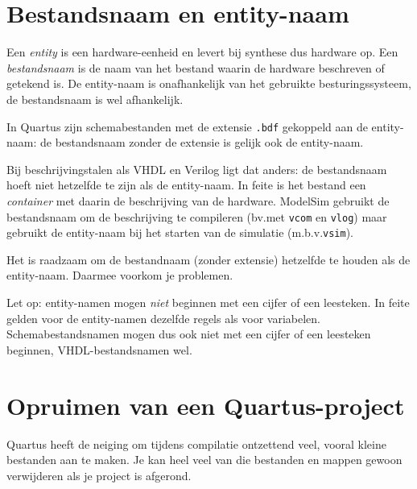\documentclass[a4paper,12pt,fleqn,twoside]{book}
\newcommand{\naam}[1]{\texttt{#1}}
\begin{document}


\section{Bestandsnaam en entity-naam}
\label{sec:bestandsnaamenentitynaam}
Een \textsl{entity} is een hardware-eenheid en levert bij synthese
dus hardware op. Een \textsl{bestandsnaam} is de naam van het bestand
waarin de hardware beschreven of getekend is. De entity-naam is
onafhankelijk van het gebruikte besturingssysteem, de bestandsnaam is
wel afhankelijk.

In Quartus zijn schemabestanden met de extensie \naam{.bdf}
gekoppeld aan de entity-naam: de bestandsnaam zonder de extensie
is gelijk ook de entity-naam.

Bij beschrijvingstalen als VHDL en Verilog ligt dat anders: de
bestandsnaam hoeft niet hetzelfde te zijn als de entity-naam. In feite
is het bestand een \textsl{container} met daarin de beschrijving
van de hardware. ModelSim gebruikt de bestandsnaam om de beschrijving
te compileren (bv.\@ met \naam{vcom} en \naam{vlog}) maar gebruikt de
entity-naam bij het starten van de simulatie (m.b.v.\@ \naam{vsim}).

Het is raadzaam om de bestandnaam (zonder extensie) hetzelfde te houden
als de entity-naam. Daarmee voorkom je problemen.

Let op: entity-namen mogen \textsl{niet} beginnen met een cijfer of
een leesteken. In feite gelden voor de entity-namen dezelfde regels als
voor variabelen. Schemabestandsnamen mogen dus ook niet met een cijfer
of een leesteken beginnen, VHDL-bestandsnamen wel.


\section{Opruimen van een Quartus-project}
\label{sec:opruimenvaneenquartusproject}
Quartus heeft de neiging om tijdens compilatie ontzettend veel, vooral kleine
bestanden aan te maken. Je kan heel veel van die bestanden en mappen gewoon
verwijderen als je project is afgerond.
\end{document}

